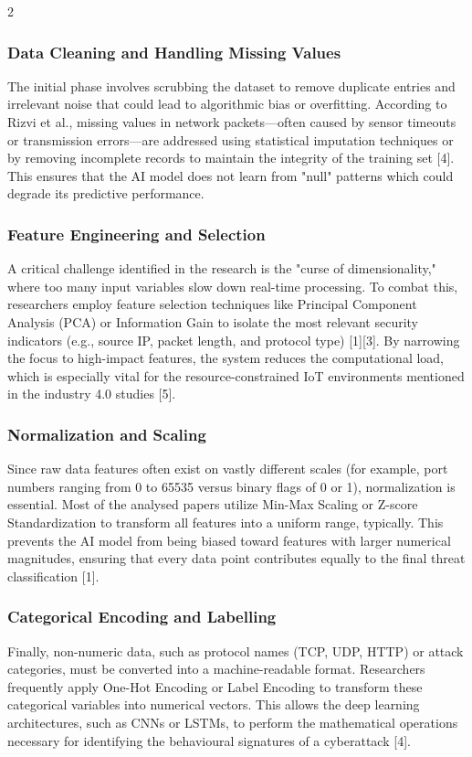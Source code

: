 \begin{multicols}{2}
  \subsubsection*{Data Cleaning and Handling Missing Values}
  The initial phase involves scrubbing the dataset to remove duplicate entries and irrelevant noise that could lead to algorithmic bias or overfitting. According to Rizvi et al., missing values in network packets—often caused by sensor timeouts or transmission errors—are addressed using statistical imputation techniques or by removing incomplete records to maintain the integrity of the training set [4]. This ensures that the AI model does not learn from "null" patterns which could degrade its predictive performance.
  \subsubsection*{Feature Engineering and Selection}
  A critical challenge identified in the research is the "curse of dimensionality," where too many input variables slow down real-time processing. To combat this, researchers employ feature selection techniques like Principal Component Analysis (PCA) or Information Gain to isolate the most relevant security indicators (e.g., source IP, packet length, and protocol type) [1][3]. By narrowing the focus to high-impact features, the system reduces the computational load, which is especially vital for the resource-constrained IoT environments mentioned in the industry 4.0 studies [5].
  \subsubsection*{Normalization and Scaling}
  Since raw data features often exist on vastly different scales (for example, port numbers ranging from 0 to 65535 versus binary flags of 0 or 1), normalization is essential. Most of the analysed papers utilize Min-Max Scaling or Z-score Standardization to transform all features into a uniform range, typically. This prevents the AI model from being biased toward features with larger numerical magnitudes, ensuring that every data point contributes equally to the final threat classification [1].
  \subsubsection*{Categorical Encoding and Labelling}
  Finally, non-numeric data, such as protocol names (TCP, UDP, HTTP) or attack categories, must be converted into a machine-readable format. Researchers frequently apply One-Hot Encoding or Label Encoding to transform these categorical variables into numerical vectors. This allows the deep learning architectures, such as CNNs or LSTMs, to perform the mathematical operations necessary for identifying the behavioural signatures of a cyberattack [4].


\end{multicols}
